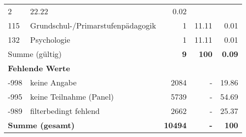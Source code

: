 \begin{longtable}{lXrrr}
       \num{2} &
       \num[round-mode=places,round-precision=2]{22.22} &
         \num[round-mode=places,round-precision=2]{0.02} \\

     115 &
     \multicolumn{1}{X}{ Grundschul-/Primarstufenpädagogik   } &


       \num{1} &
       \num[round-mode=places,round-precision=2]{11.11} &
         \num[round-mode=places,round-precision=2]{0.01} \\

     132 &
     \multicolumn{1}{X}{ Psychologie   } &


       \num{1} &
       \num[round-mode=places,round-precision=2]{11.11} &
         \num[round-mode=places,round-precision=2]{0.01} \\
     \midrule
     \multicolumn{2}{l}{Summe (gültig)} &
       \textbf{\num{9}} &
     \textbf{\num{100}} &
       \textbf{\num[round-mode=places,round-precision=2]{0.09}} \\
     \multicolumn{5}{l}{\textbf{Fehlende Werte}}\\
       -998 &
       keine Angabe &
         \num{2084} &
        - &
         \num[round-mode=places,round-precision=2]{19.86} \\
       -995 &
       keine Teilnahme (Panel) &
         \num{5739} &
        - &
         \num[round-mode=places,round-precision=2]{54.69} \\
       -989 &
       filterbedingt fehlend &
         \num{2662} &
        - &
         \num[round-mode=places,round-precision=2]{25.37} \\
     \midrule
     \multicolumn{2}{l}{\textbf{Summe (gesamt)}} &
          \textbf{\num{10494}} &
        \textbf{-} &
        \textbf{\num{100}} \\
     \bottomrule
     \end{longtable}
     
